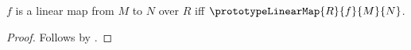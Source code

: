 \begin{theorem}\label{spike_linear_map_equivalence}
    $f$ is a linear map from $M$ to $N$ over $R$ iff
        $\prototypeLinearMap{R}{f}{M}{N}$.
\end{theorem}
\begin{proof}
    Follows by
        .
\end{proof}
